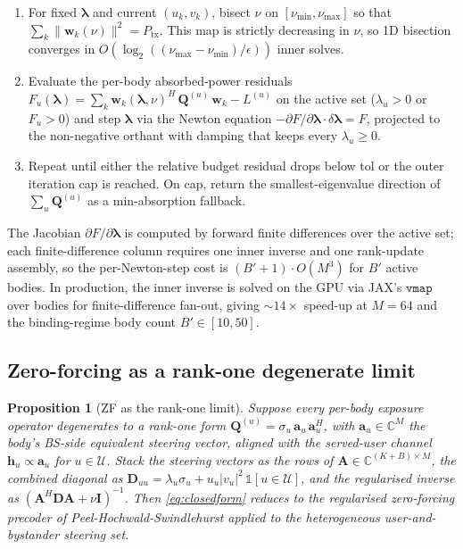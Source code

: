 \documentclass[journal,twocolumn,10pt]{IEEEtran}
\theoremstyle{plain}
\newtheorem{proposition}[theorem]{Proposition}
\theoremstyle{remark}
\newcommand{\hh}{\mathbf{h}}
\newcommand{\ww}{\mathbf{w}}
\newcommand{\Qmat}{\mathbf{Q}}
\newcommand{\Complex}{\mathbb{C}}
\newcommand{\Served}{\mathcal{U}}
\begin{document}
\begin{enumerate}
\item For fixed $\bm\lambda$ and current $(u_k, v_k)$, bisect $\nu$
  on $[\nu_{\min}, \nu_{\max}]$ so that
  $\sum_k \|\ww_k(\nu)\|^2 = P_{\mathrm{tx}}$. This map is strictly
  decreasing in $\nu$, so 1D bisection converges in
  $O(\log_2((\nu_{\max} - \nu_{\min})/\epsilon))$ inner solves.
\item Evaluate the per-body absorbed-power residuals
  $F_u(\bm\lambda) = \sum_k \ww_k(\bm\lambda,
  \nu)^H\,\Qmat^{(u)}\,\ww_k - L^{(u)}$ on the active set
  ($\lambda_u > 0$ or $F_u > 0$) and step $\bm\lambda$ via the
  Newton equation $-\partial F/\partial \bm\lambda \cdot
  \delta\bm\lambda = F$, projected to the non-negative orthant
  with damping that keeps every $\lambda_u \geq 0$.
\item Repeat until either the relative budget residual drops below
  $\mathrm{tol}$ or the outer iteration cap is reached. On cap,
  return the smallest-eigenvalue direction of
  $\sum_u \Qmat^{(u)}$ as a min-absorption fallback.
\end{enumerate}

The Jacobian $\partial F/\partial \bm\lambda$ is computed by
forward finite differences over the active set; each finite-difference
column requires one inner inverse and one rank-update assembly,
so the per-Newton-step cost is $(B' + 1) \cdot O(M^3)$ for
$B'$ active bodies. In production, the inner inverse is solved
on the GPU via JAX's $\mathtt{vmap}$ over bodies for
finite-difference fan-out, giving $\sim 14\times$ speed-up at
$M = 64$ and the binding-regime body count $B' \in [10, 50]$.

\subsection{Zero-forcing as a rank-one degenerate limit}\label{sec:zf-limit}

\begin{proposition}[ZF as the rank-one limit]\label{prop:ZFlimit}
Suppose every per-body exposure operator degenerates to a rank-one
form $\Qmat^{(u)} = \sigma_u\,\mathbf{a}_u\,\mathbf{a}_u^H$, with
$\mathbf{a}_u \in \Complex^M$ the body's BS-side equivalent steering
vector, aligned with the served-user channel
$\hh_u \propto \mathbf{a}_u$ for $u \in \Served$. Stack the
steering vectors as the rows of $\mathbf{A} \in \Complex^{(K+B)
\times M}$, the combined diagonal as $\mathbf{D}_{uu} = \lambda_u
\sigma_u + u_u |v_u|^2\,\mathbb{1}[u \in \Served]$, and the
regularised inverse as $(\mathbf{A}^H \mathbf{D} \mathbf{A} + \nu
\mathbf{I})^{-1}$. Then \cref{eq:closedform} reduces to the
regularised zero-forcing precoder of Peel-Hochwald-Swindlehurst
\cite{PeelHochwald2005} applied to the heterogeneous
user-and-bystander steering set.
\end{proposition}
\end{document}
